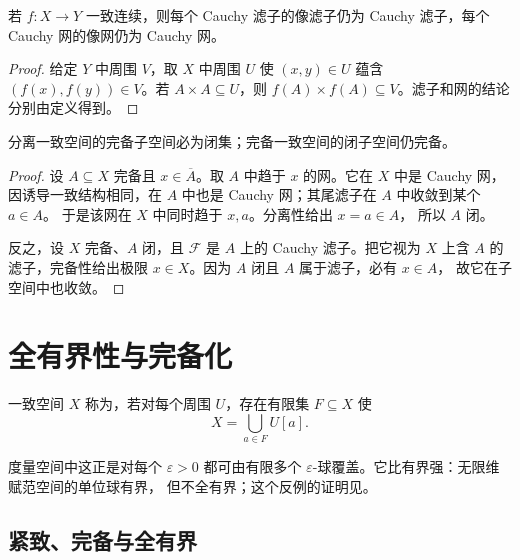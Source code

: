 \begin{proposition}
\label{prop:uniform-map-preserves-cauchy}
若 \(f:X\to Y\) 一致连续，则每个 Cauchy 滤子的像滤子仍为 Cauchy
滤子，每个 Cauchy 网的像网仍为 Cauchy 网。
\end{proposition}

\begin{proof}
给定 \(Y\) 中周围 \(V\)，取 \(X\) 中周围 \(U\) 使
\((x,y)\in U\) 蕴含 \((f(x),f(y))\in V\)。若
\(A\times A\subseteq U\)，则
\(f(A)\times f(A)\subseteq V\)。滤子和网的结论分别由定义得到。
\end{proof}

\begin{proposition}[完备子空间]
\label{prop:complete-subspace-closed-uniform}
分离一致空间的完备子空间必为闭集；完备一致空间的闭子空间仍完备。
\end{proposition}

\begin{proof}
设 \(A\subseteq X\) 完备且 \(x\in\overline A\)。取 \(A\) 中趋于
\(x\) 的网。它在 \(X\) 中是 Cauchy 网，因诱导一致结构相同，在
\(A\) 中也是 Cauchy 网；其尾滤子在 \(A\) 中收敛到某个 \(a\in A\)。
于是该网在 \(X\) 中同时趋于 \(x,a\)。分离性给出 \(x=a\in A\)，
所以 \(A\) 闭。

反之，设 \(X\) 完备、\(A\) 闭，且 \(\mathcal F\) 是 \(A\) 上的
Cauchy 滤子。把它视为 \(X\) 上含 \(A\) 的滤子，完备性给出极限
\(x\in X\)。因为 \(A\) 闭且 \(A\) 属于滤子，必有 \(x\in A\)，
故它在子空间中也收敛。
\end{proof}

\section{全有界性与完备化}

\begin{definition}[全有界]
一致空间 \(X\) 称为，若对每个周围 \(U\)，存在有限集
\(F\subseteq X\) 使
\[
 X=\bigcup_{a\in F}U[a].
\]
\end{definition}

度量空间中这正是对每个 \(\varepsilon>0\) 都可由有限多个
\(\varepsilon\)-球覆盖。它比有界强：无限维赋范空间的单位球有界，
但不全有界；这个反例的证明见。

\subsection{紧致、完备与全有界}

